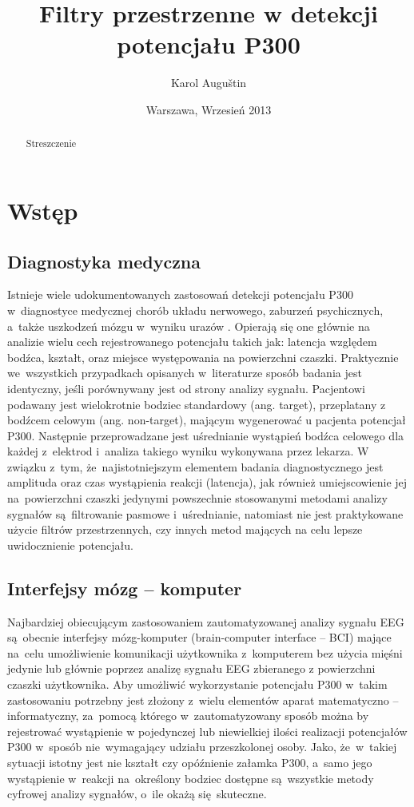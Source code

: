 \documentclass[licencjacka,openright]{pracamgr}
\author{ Karol Auguštin }
\title{ Filtry przestrzenne w detekcji potencjału P300 }
\date{Warszawa, Wrzesień 2013}
\begin{document}
\let\cleardoublepage\clearpage
\maketitle
\begin{abstract}
\par Streszczenie
\end{abstract}
\tableofcontents

\chapter{Wstęp}
\section{Diagnostyka medyczna}
Istnieje wiele udokumentowanych zastosowań detekcji potencjału P300 w~diagnostyce medycznej chorób układu nerwowego, zaburzeń psychicznych, a~także uszkodzeń mózgu w~wyniku urazów \cite{zgorzalewicz2000}. Opierają się one głównie na analizie wielu cech rejestrowanego potencjału takich jak: latencja względem bodźca, kształt, oraz miejsce występowania na powierzchni czaszki. Praktycznie we~wszystkich przypadkach opisanych w~literaturze sposób badania jest identyczny, jeśli porównywany jest od strony analizy sygnału. Pacjentowi podawany jest wielokrotnie bodziec standardowy (ang. target), przeplatany z bodźcem celowym (ang. non-target), mającym wygenerować u pacjenta potencjał P300. Następnie przeprowadzane jest uśrednianie wystąpień bodźca celowego dla każdej z~elektrod i~analiza takiego wyniku wykonywana przez lekarza. 
W związku z~tym, że~najistotniejszym elementem badania diagnostycznego jest amplituda oraz czas wystąpienia reakcji (latencja), jak również umiejscowienie jej na~powierzchni czaszki  jedynymi powszechnie stosowanymi metodami analizy sygnałów są~filtrowanie pasmowe i~uśrednianie, natomiast nie jest praktykowane użycie filtrów przestrzennych, czy innych metod mających na celu lepsze uwidocznienie potencjału.
\section{Interfejsy mózg -- komputer}
Najbardziej obiecującym zastosowaniem zautomatyzowanej analizy sygnału EEG są~obecnie interfejsy mózg-komputer (brain-computer interface -- BCI) mające na~celu umożliwienie komunikacji użytkownika z~komputerem bez użycia mięśni jedynie lub głównie poprzez analizę sygnału EEG zbieranego z powierzchni czaszki użytkownika. Aby umożliwić wykorzystanie potencjału P300 w~takim zastosowaniu potrzebny jest złożony z~wielu elementów aparat matematyczno -- informatyczny, za~pomocą którego w~zautomatyzowany sposób można by rejestrować wystąpienie w pojedynczej lub niewielkiej ilości realizacji potencjałów P300 w~sposób nie~wymagający udziału przeszkolonej osoby. Jako, że~w~takiej sytuacji istotny jest nie kształt czy opóźnienie załamka P300, a~samo jego wystąpienie w~reakcji na~określony bodziec dostępne są~wszystkie metody cyfrowej analizy sygnałów, o~ile okażą się~skuteczne.
\end{document}
